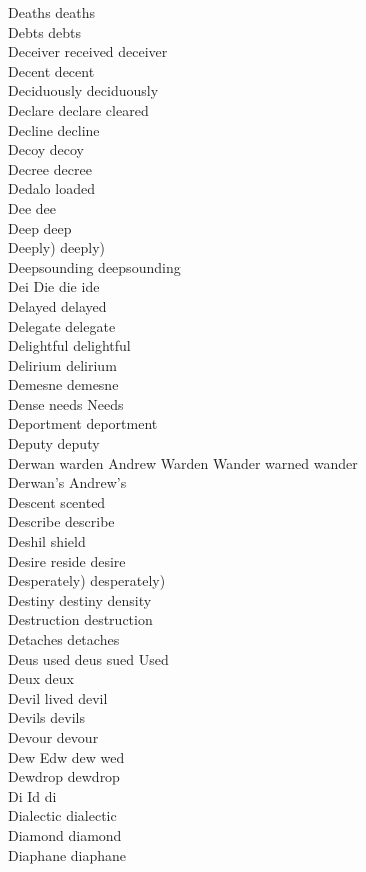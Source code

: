 Deaths deaths\\
Debts debts\\
Deceiver received deceiver\\
Decent decent\\
Deciduously deciduously\\
Declare declare cleared\\
Decline decline\\
Decoy decoy\\
Decree decree\\
Dedalo loaded\\
Dee dee\\
Deep deep\\
Deeply) deeply)\\
Deepsounding deepsounding\\
Dei Die die ide\\
Delayed delayed\\
Delegate delegate\\
Delightful delightful\\
Delirium delirium\\
Demesne demesne\\
Dense needs Needs\\
Deportment deportment\\
Deputy deputy\\
Derwan warden Andrew Warden Wander warned wander\\
Derwan's Andrew's\\
Descent scented\\
Describe describe\\
Deshil shield\\
Desire reside desire\\
Desperately) desperately)\\
Destiny destiny density\\
Destruction destruction\\
Detaches detaches\\
Deus used deus sued Used\\
Deux deux\\
Devil lived devil\\
Devils devils\\
Devour devour\\
Dew Edw dew wed\\
Dewdrop dewdrop\\
Di Id di\\
Dialectic dialectic\\
Diamond diamond\\
Diaphane diaphane\\
